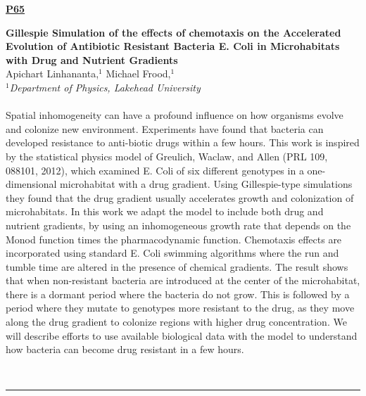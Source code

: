 \documentclass[titlepage,oneside,openany,10pt]{book}
\newenvironment{posterabs}[4] %
        {
	\begin{flushright}
                \underline{\textbf{#4}}
        \end{flushright}
        \textbf{#1}\\%
        #2\\%
        \textit{#3}\\\\%
        }
        {
        \\
        \noindent\rule{15cm}{0.5pt}%
        }
\begin{document}
\begin{posterabs}
	{Gillespie Simulation of the effects of chemotaxis on the Accelerated Evolution of Antibiotic Resistant Bacteria E. Coli in Microhabitats with Drug and Nutrient Gradients}
	{Apichart Linhananta,$^{1}$ Michael Frood,$^{1}$}
	{
	$^1$Department of Physics, Lakehead University
	}
	{P65}
	Spatial inhomogeneity can have a profound influence on how organisms evolve and colonize new environment. Experiments have found that bacteria can developed resistance to anti-biotic drugs within a few hours. This work is inspired by the statistical physics model of Greulich, Waclaw, and Allen (PRL 109, 088101, 2012), which examined E. Coli of six different genotypes in a one-dimensional microhabitat with a drug gradient. Using Gillespie-type simulations they found that the drug gradient usually accelerates growth and colonization of microhabitats. In this work we adapt the model to include both drug and nutrient gradients, by using an inhomogeneous growth rate that depends on the Monod function times the pharmacodynamic function. Chemotaxis effects are incorporated using standard E. Coli swimming algorithms where the run and tumble time are altered in the presence of chemical gradients. The result shows that when non-resistant bacteria are introduced at the center of the microhabitat, there is a dormant period where the bacteria do not grow. This is followed by a period where they mutate to genotypes more resistant to the drug, as they move along the drug gradient to colonize regions with higher drug concentration. We will describe efforts to use available biological data with the model to understand how bacteria can become drug resistant in a few hours.
	\label{LinhanantaA}
\end{posterabs}

\newpage
\end{document}
